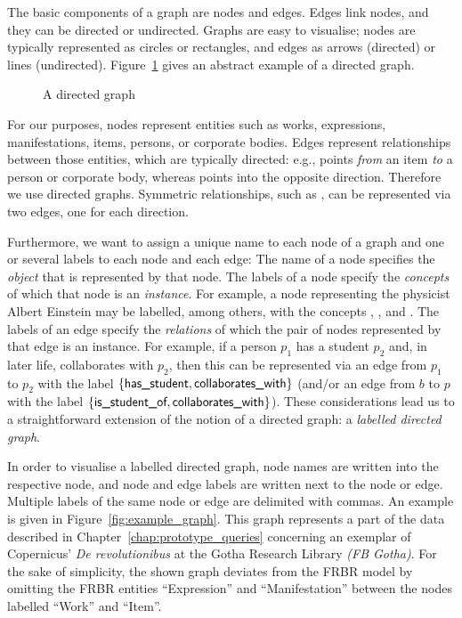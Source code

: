 The basic components of a graph are nodes and edges. Edges link nodes, and they can be directed
or undirected. Graphs are easy to visualise; nodes are typically represented as circles
or rectangles, and edges as arrows (directed) or lines (undirected).
Figure~\ref{fig:example_graph_abstract} gives an abstract example of a directed graph.
%
\begin{figure}[ht]
  \centering
  \caption{A directed graph}
  \label{fig:example_graph_abstract}
\end{figure}
%
For our purposes,
nodes represent entities such as works, expressions, manifestations, items,
persons, or corporate bodies.
Edges represent relationships between those entities, which are typically directed:
e.g.,  points \emph{from} an item
\emph{to} a person or corporate body,
whereas  points into the opposite direction.
Therefore we use directed graphs.
Symmetric relationships, such as ,
can be represented via two edges, one for each direction.

Furthermore, we want to assign a unique name to each node of a graph
and one or several labels to each node and each edge:
The name of a node specifies the \emph{object} that is represented by that node.
The labels of a node specify the \emph{concepts}
of which that node is an \emph{instance}.
For example, a node representing the physicist Albert Einstein
may be labelled, among others, with the concepts , ,
and .
The labels of an edge specify the \emph{relations} of which the pair of nodes
represented by that edge is an instance.
For example, if a person $p_1$ has a student $p_2$ and, in later life, 
collaborates with $p_2$, then this can be represented via an edge from $p_1$ to $p_2$
with the label $\{\textsf{has\_student},\textsf{collaborates\_with}\}$
(and/or an edge from $b$ to $p$ with the label $\{\textsf{is\_student\_of},\textsf{collaborates\_with}\}$).
These considerations lead us to a straightforward extension
of the notion of a directed graph:
a \emph{labelled directed graph}.


In order to visualise a labelled directed graph,
node names are written into the respective node,
and node and edge labels are written next to the node or edge.
Multiple labels of the same node or edge are delimited with commas.
An example is given in Figure~\ref{fig:example_graph}.
This graph represents a part of the data described in Chapter~\ref{chap:prototype_queries}
concerning an exemplar of Copernicus' \emph{De revolutionibus} at the
Gotha Research Library \emph{(FB Gotha)}.
For the sake of simplicity, the shown graph deviates from the FRBR model
by omitting the FRBR entities \enquote{Expression} and \enquote{Manifestation}
between the nodes labelled \enquote{Work} and \enquote{Item}.

